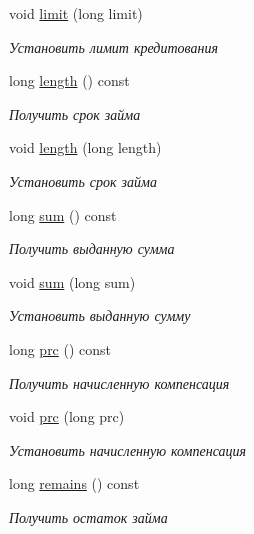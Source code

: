 \begin{DoxyCompactItemize}
void \hyperlink{classkpk_1_1data_1_1_loan_a83d5b22665f19627d26f3a57903511e6}{limit} (long limit)
\begin{DoxyCompactList}\small\item\em Установить лимит кредитования \end{DoxyCompactList}\item 
long \hyperlink{classkpk_1_1data_1_1_loan_a89c1fd9e63d8923796f0cb3452bafa27}{length} () const 
\begin{DoxyCompactList}\small\item\em Получить срок займа \end{DoxyCompactList}\item 
void \hyperlink{classkpk_1_1data_1_1_loan_af134c522e66faccb01b71c69c801ac6f}{length} (long length)
\begin{DoxyCompactList}\small\item\em Установить срок займа \end{DoxyCompactList}\item 
long \hyperlink{classkpk_1_1data_1_1_loan_a5b207380d82a2079ea83ec1ecf11f090}{sum} () const 
\begin{DoxyCompactList}\small\item\em Получить выданную сумма \end{DoxyCompactList}\item 
void \hyperlink{classkpk_1_1data_1_1_loan_a07ba28ed26a7a422b5c2435dbacd3825}{sum} (long sum)
\begin{DoxyCompactList}\small\item\em Установить выданную сумму \end{DoxyCompactList}\item 
long \hyperlink{classkpk_1_1data_1_1_loan_aabe63b94775011f6c971d8fb7a9cf5b0}{prc} () const 
\begin{DoxyCompactList}\small\item\em Получить начисленную компенсация \end{DoxyCompactList}\item 
void \hyperlink{classkpk_1_1data_1_1_loan_ae7141c53eac6c77d33c9e78eca17427d}{prc} (long prc)
\begin{DoxyCompactList}\small\item\em Установить начисленную компенсация \end{DoxyCompactList}\item 
long \hyperlink{classkpk_1_1data_1_1_loan_a3a85e20cceb9a563153d51fe07f15262}{remains} () const 
\begin{DoxyCompactList}\small\item\em Получить остаток займа \end{DoxyCompactList}\item 

\end{DoxyCompactItemize}
